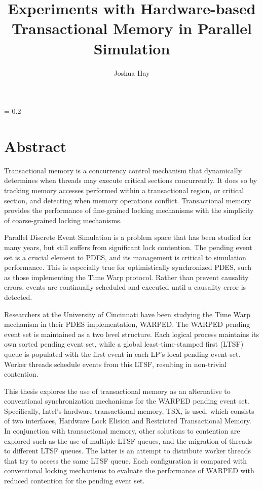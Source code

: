 \documentclass[a4paper]{article}
\title{
    \vspace{2in}
    \textbf{Experiments with Hardware-based Transactional Memory in Parallel
    Simulation \\}
    \vspace{2in}
}
\author{Joshua Hay}
\affil{hayja@mail.uc.edu}
\affil{(513) 607-4929}
\begin{document}
%
\maketitle
\thispagestyle{empty}
\newpage
\thispagestyle{empty}
\parskip = 0.2\baselineskip
\newpage
\thispagestyle{empty}
\section*{\textbf{Abstract}}

Transactional memory is a concurrency control mechanism that dynamically
determines when threads may execute critical sections concurrently.  It does so
by tracking memory accesses performed within a transactional region, or critical
section, and detecting when memory operations conflict.  Transactional memory
provides the performance of fine-grained locking mechanisms with the simplicity
of coarse-grained locking mechanisms.
\par

Parallel Discrete Event Simulation is a problem space that has been studied for
many years, but still suffers from significant lock contention.  The pending
event set is a crucial element to PDES, and its management is critical to
simulation performance.  This is especially true for optimistically
synchronized PDES, such as those implementing the Time Warp protocol.  Rather
than prevent causality errors, events are continually scheduled and executed
until a causality error is detected.  
\par

Researchers at the University of Cincinnati have been studying the Time Warp
mechanism in their PDES implementation, WARPED.  The WARPED pending event set is
maintained as a two level structure.  Each logical process maintains its own
sorted pending event set, while a global least-time-stamped first (LTSF) queue is
populated with the first event in each LP's local pending event set.  Worker
threads schedule events from this LTSF, resulting in non-trivial contention.
\par

This thesis explores the use of transactional memory as an alternative to
conventional synchronization mechanisms for the WARPED pending event set.
Specifically, Intel's hardware transactional memory, TSX, is used, which
consists of two interfaces, Hardware Lock Elision and Restricted Transactional
Memory.  In conjunction with transactional memory, other solutions to contention
are explored such as the use of multiple LTSF queues, and the migration of
threads to different LTSF queues.  The latter is an attempt to distribute worker
threads that try to access the same LTSF queue.  Each configuration is compared
with conventional locking mechanisms to evaluate the performance of WARPED with
reduced contention for the pending event set.
\par
\end{document}
